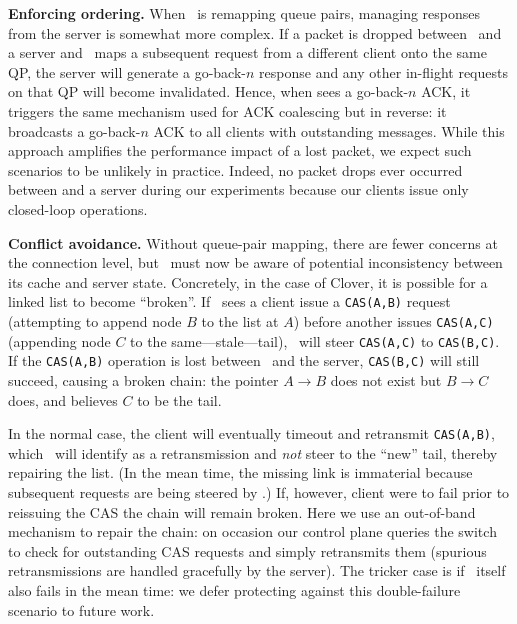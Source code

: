 \textbf{Enforcing ordering.}
When \sword\ is remapping queue pairs, managing responses from the
server is somewhat more complex.  If a packet is dropped between
\sword\ and a server and \sword\ maps a subsequent request from a
different client onto the same QP, the server will generate a
go-back-$n$ response and any other in-flight requests on that QP will
become invalidated.  Hence, when {\sword} sees a go-back-$n$ ACK, it
triggers the same mechanism used for ACK coalescing but in reverse: it
broadcasts a go-back-$n$ ACK to all clients with outstanding messages.
While this approach amplifies the performance impact of a lost packet,
we expect such scenarios to be unlikely in practice.  Indeed, no
packet drops ever occurred between {\sword} and a server during our
experiments because our clients issue only closed-loop operations.

\textbf{Conflict avoidance.} Without queue-pair mapping, there are
fewer concerns at the connection level, but \sword\ must now be aware
of potential inconsistency between its cache and server state.
Concretely, in the case of Clover, it is possible for a linked list to
become ``broken''.  If \sword\ sees a client issue a \texttt{CAS(A,B)}
request (attempting to append node $B$ to the list at $A$) before
another issues \texttt{CAS(A,C)} (appending node $C$ to the
same---stale---tail), \sword\ will steer \texttt{CAS(A,C)} to
\texttt{CAS(B,C)}. If the \texttt{CAS(A,B)} operation is lost between
\sword\ and the server, \texttt{CAS(B,C)} will still succeed, causing
a broken chain: the pointer $A\rightarrow B$ does not exist but
$B\rightarrow C$ does, and {\sword} believes $C$ to be the tail.

In the normal case, the client will eventually timeout and retransmit
\texttt{CAS(A,B)}, which \sword\ will identify as a retransmission and
\emph{not} steer to the ``new'' tail, thereby repairing the list.  (In
the mean time, the missing link is immaterial because
subsequent requests are being steered by \sword.)  If, however, client
were to fail prior to reissuing the CAS the chain will remain broken.
Here we use an out-of-band mechanism to repair the chain: on occasion
our control plane queries the switch to check for outstanding CAS
requests and simply retransmits them (spurious retransmissions are
handled gracefully by the server).  The tricker case is if
\sword\ itself also fails in the mean time: we defer protecting
against this double-failure scenario to future work.



